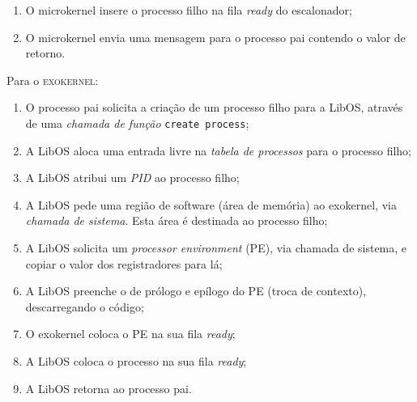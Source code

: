 \begin{exercicio}
\begin{enumerate}
    \item O microkernel insere o processo filho na fila \textit{ready} do escalonador;

    \item O microkernel envia uma mensagem para o processo pai contendo o valor de retorno.
  \end{enumerate}

  Para o \textsc{exokernel}:
  \begin{enumerate}
    \item O processo pai solicita a criação de um processo filho para a LibOS, através de uma \textit{chamada de função} \texttt{create process};

    \item A LibOS aloca uma entrada livre na \textit{tabela de processos} para o processo filho;

    \item A LibOS atribui um \textit{PID} ao processo filho;

    \item A LibOS pede uma região de software (área de memória) ao exokernel, via \textit{chamada de sistema}. Esta área é destinada ao processo filho;

    \item A LibOS solicita um \textit{processor environment} (PE), via chamada de sistema, e copiar o valor dos registradores para lá;

    \item A LibOS preenche o de prólogo e epílogo do PE (troca de contexto), descarregando o código;

    \item O exokernel coloca o PE na sua fila \textit{ready};

    \item A LibOS coloca o processo na sua fila \textit{ready};

    \item A LibOS retorna ao processo pai.
  \end{enumerate}

\end{exercicio}




